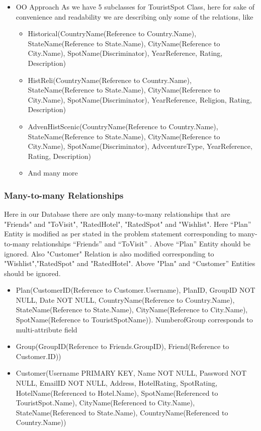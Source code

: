 \documentclass[11pt]{article}
\begin{document}
\begin{itemize}
\begin{itemize}
\begin{itemize}
\end{itemize}
\item OO Approach \newline
As we have 5 subclasses for TouristSpot Class, here for sake of convenience and readability we are describing only some of the relations, like
\begin{itemize}
\item Historical(CountryName(Reference to Country.Name), StateName(Reference to State.Name), CityName(Reference to City.Name), SpotName(Discriminator), YearReference, Rating, Description)
\item HistReli(CountryName(Reference to Country.Name), StateName(Reference to State.Name), CityName(Reference to City.Name), SpotName(Discriminator), YearReference, Religion, Rating, Description)
\item AdvenHistScenic(CountryName(Reference to Country.Name), StateName(Reference to State.Name), CityName(Reference to City.Name), SpotName(Discriminator), AdvcentureType, YearReference, Rating, Description)
\item And many more
\end{itemize}
\end{itemize}
\end{itemize}

\subsubsection{Many-to-many Relationships}
Here in our Database there are only many-to-many relationships that are "Friends" and "ToVisit", "RatedHotel", "RatedSpot" and "Wishlist". Here “Plan” Entity is modified as per stated in the problem statement corresponding to many-to-many relationships “Friends” and “ToVisit” . Above “Plan” Entity should be ignored. Also "Customer" Relation is also modified corresponding to "Wishlist","RatedSpot" and "RatedHotel". Above "Plan" and “Customer” Entities should be ignored.
\begin{itemize}
\item Plan(CustomerID(Reference to Customer.Username), PlanID, GroupID NOT NULL, Date NOT NULL, CountryName(Reference to Country.Name), StateName(Reference to State.Name), CityName(Reference to City.Name), SpotName(Reference to TouristSpotName)). NumberofGroup corresponds to multi-attribute field

\item Group(GroupID(Reference to Friends.GroupID), Friend(Reference to Customer.ID))

\item Customer(Username PRIMARY KEY, Name NOT NULL, Password NOT NULL, EmailID NOT NULL, Address, HotelRating, SpotRating, HotelName(Referenced to Hotel.Name), SpotName(Referenced to TouristSpot.Name), CityName(Referenced to City.Name), StateName(Referenced to State.Name), CountryName(Referenced to Country.Name))
\end{itemize}
\end{document}
